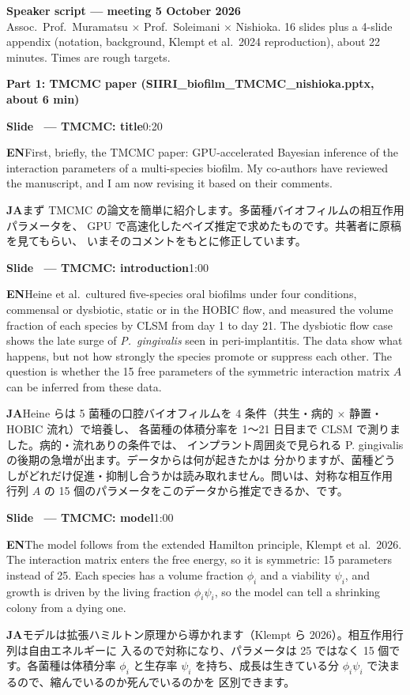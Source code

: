 \documentclass[11pt,a4paper]{article}
\newcounter{sl}
\newcommand{\slide}[2]{\stepcounter{sl}\vspace{8pt}%
  {\color{c3}\large\bfseries Slide \thesl\ --- #1}\hfill{\small #2}\par\vspace{2pt}}
\newcommand{\EN}{\textbf{EN}\quad}
\newcommand{\JA}{\par\textbf{JA}\quad}
\begin{document}
{\Large\bfseries Speaker script --- meeting 5 October 2026}\\[2pt]
Assoc.\ Prof.\ Muramatsu $\times$ Prof.\ Soleimani $\times$ Nishioka.
16 slides plus a 4-slide appendix (notation, background, Klempt et al.\ 2024 reproduction), about 22 minutes. Times are rough targets.

{\large\bfseries Part 1: TMCMC paper (SIIRI\_biofilm\_TMCMC\_nishioka.pptx, about 6 min)}\par

\slide{TMCMC: title}{0:20}
\EN First, briefly, the TMCMC paper: GPU-accelerated Bayesian inference of
the interaction parameters of a multi-species biofilm. My co-authors have
reviewed the manuscript, and I am now revising it based on their comments.
\JA まず TMCMC の論文を簡単に紹介します。多菌種バイオフィルムの相互作用パラメータを、
GPU で高速化したベイズ推定で求めたものです。共著者に原稿を見てもらい、
いまそのコメントをもとに修正しています。

\slide{TMCMC: introduction}{1:00}
\EN Heine et al.\ cultured five-species oral biofilms under four conditions,
commensal or dysbiotic, static or in the HOBIC flow, and measured the volume
fraction of each species by CLSM from day 1 to day 21. The dysbiotic flow
case shows the late surge of \textit{P.~gingivalis} seen in peri-implantitis.
The data show what happens, but not how strongly the species promote or
suppress each other. The question is whether the 15 free parameters of the
symmetric interaction matrix $A$ can be inferred from these data.
\JA Heine らは 5 菌種の口腔バイオフィルムを 4 条件（共生・病的 × 静置・HOBIC 流れ）で培養し、
各菌種の体積分率を 1〜21 日目まで CLSM で測りました。病的・流れありの条件では、
インプラント周囲炎で見られる P. gingivalis の後期の急増が出ます。データからは何が起きたかは
分かりますが、菌種どうしがどれだけ促進・抑制し合うかは読み取れません。問いは、対称な相互作用
行列 $A$ の 15 個のパラメータをこのデータから推定できるか、です。

\slide{TMCMC: model}{1:00}
\EN The model follows from the extended Hamilton principle, Klempt et al.\ 2026.
The interaction matrix enters the free energy, so it is symmetric: 15
parameters instead of 25. Each species has a volume fraction $\phi_i$ and a
viability $\psi_i$, and growth is driven by the living fraction $\phi_i\psi_i$,
so the model can tell a shrinking colony from a dying one.
\JA モデルは拡張ハミルトン原理から導かれます（Klempt ら 2026）。相互作用行列は自由エネルギーに
入るので対称になり、パラメータは 25 ではなく 15 個です。各菌種は体積分率 $\phi_i$ と生存率
$\psi_i$ を持ち、成長は生きている分 $\phi_i\psi_i$ で決まるので、縮んでいるのか死んでいるのかを
区別できます。
\end{document}
